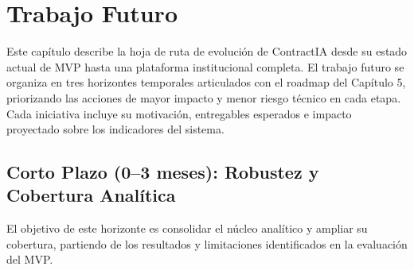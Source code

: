 \chapter{Trabajo Futuro}

Este capítulo describe la hoja de ruta de evolución de ContractIA desde su
estado actual de MVP hasta una plataforma institucional completa. El trabajo
futuro se organiza en tres horizontes temporales articulados con el roadmap
del Capítulo 5, priorizando las acciones de mayor impacto y menor riesgo
técnico en cada etapa. Cada iniciativa incluye su motivación, entregables
esperados e impacto proyectado sobre los indicadores del sistema.

\section*{Corto Plazo (0--3 meses): Robustez y Cobertura Analítica}

El objetivo de este horizonte es consolidar el núcleo analítico y ampliar
su cobertura, partiendo de los resultados y limitaciones identificados en
la evaluación del MVP.

